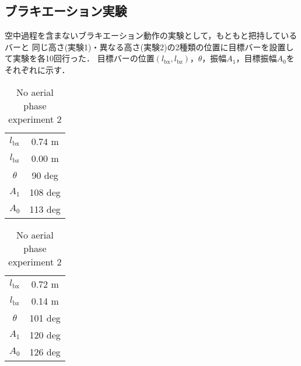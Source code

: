         
        \newpage
        \subsection{ブラキエーション実験}

        空中過程を含まないブラキエーション動作の実験として，もともと把持しているバーと
        同じ高さ(実験1)・異なる高さ(実験2)の2種類の位置に目標バーを設置して実験を各10回行った．
        目標バーの位置$(l_{\mathrm{bx}},l_{\mathrm{bz}})$，$\theta$，振幅$A_1$，目標振幅$A_0$を
        それぞれに示す．
        \begin{table}[t]
                \begin{minipage}[c]{0.5\hsize}
                  \centering
                  \caption{No aerial phase experiment 1}
                  \vspace{2mm}
                  \begin{tabular}{c|c}
                    \hline
                    $l_{\mathrm{bx}}$ & 0.74 m \\
                    $l_{\mathrm{bz}}$ & 0.00 m \\
                    $\theta$ & 90 deg \\ 
                    $A_1$ & 108 deg \\
                    $A_0$ & 113 deg \\
                    \hline
                  \end{tabular}
                \end{minipage}
                \begin{minipage}[c]{0.5\hsize}
                  \centering
                  \caption{No aerial phase experiment 2}
                  \vspace{2mm}
                  \begin{tabular}{c|c}
                    \hline
                    $l_{\mathrm{bx}}$ & 0.72 m \\
                    $l_{\mathrm{bz}}$ & 0.14 m \\
                    $\theta$ & 101 deg \\ 
                    $A_1$ & 120 deg \\
                    $A_0$ & 126 deg \\
                    \hline
                  \end{tabular}
                \end{minipage}
              \end{table}
        
